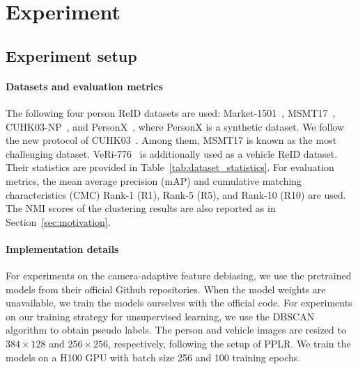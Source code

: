 \section{Experiment}
\label{sec:experiment}






\subsection{Experiment setup}

\paragraph{Datasets and evaluation metrics}
The following four person ReID datasets are used: Market-1501~\cite{market}, MSMT17~\cite{msmt}, CUHK03-NP~\cite{cuhk_np}, and PersonX~\cite{personx}, where PersonX is a synthetic dataset.
We follow the new protocol of CUHK03~\cite{cuhk}.
Among them, MSMT17 is known as the most challenging dataset.
VeRi-776~\cite{veri} is additionally used as a vehicle ReID dataset.
Their statistics are provided in Table~\ref{tab:dataset_statistics}. 
For evaluation metrics, the mean average precision (mAP) and cumulative matching characteristics (CMC) Rank-1 (R1), Rank-5 (R5), and Rank-10 (R10) are used.
The NMI scores of the clustering results are also reported as in Section~\ref{sec:motivation}.

\paragraph{Implementation details}
For experiments on the camera-adaptive feature debiasing, we use the pretrained models from their official Github repositories. 
When the model weights are unavailable, we train the models ourselves with the official code.
For experiments on our training strategy for unsupervised learning, we use the DBSCAN~\cite{dbscan} algorithm to obtain pseudo labels.
The person and vehicle images are resized to $384\times128$ and $256\times256$, respectively, following the setup of PPLR.
We train the models on a H100 GPU with batch size 256 and 100 training epochs.


